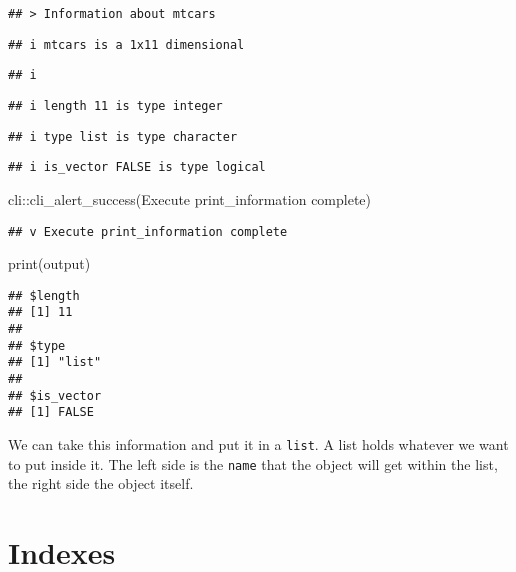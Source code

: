 \documentclass[
]{book}
\newenvironment{Shaded}{\begin{snugshade}}{\end{snugshade}}
\newcommand{\FunctionTok}[1]{\textcolor[rgb]{0.00,0.00,0.00}{#1}}
\newcommand{\NormalTok}[1]{#1}
\newcommand{\SpecialCharTok}[1]{\textcolor[rgb]{0.00,0.00,0.00}{#1}}
\newcommand{\StringTok}[1]{\textcolor[rgb]{0.31,0.60,0.02}{#1}}
\begin{document}
\begin{verbatim}
## > Information about mtcars
\end{verbatim}

\begin{verbatim}
## i mtcars is a 1x11 dimensional
\end{verbatim}

\begin{verbatim}
## i
\end{verbatim}

\begin{verbatim}
## i length 11 is type integer
\end{verbatim}

\begin{verbatim}
## i type list is type character
\end{verbatim}

\begin{verbatim}
## i is_vector FALSE is type logical
\end{verbatim}

\begin{Shaded}
\begin{Highlighting}[]
\NormalTok{cli}\SpecialCharTok{::}\FunctionTok{cli\_alert\_success}\NormalTok{(}\StringTok{\textquotesingle{}Execute print\_information complete\textquotesingle{}}\NormalTok{)}
\end{Highlighting}
\end{Shaded}

\begin{verbatim}
## v Execute print_information complete
\end{verbatim}

\begin{Shaded}
\begin{Highlighting}[]
\FunctionTok{print}\NormalTok{(output)}
\end{Highlighting}
\end{Shaded}

\begin{verbatim}
## $length
## [1] 11
## 
## $type
## [1] "list"
## 
## $is_vector
## [1] FALSE
\end{verbatim}

We can take this information and put it in a \texttt{list}. A list holds whatever we want to put inside it. The left side is the \texttt{name} that the object will get within the list, the right side the object itself.

\hypertarget{indexes}{%
\section{Indexes}\label{indexes}}
\end{document}
